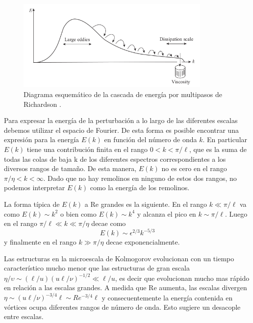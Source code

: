 \documentclass[a4paper,11pt]{report}
\begin{document}
\begin{figure}[ht]
\begin{center}
\includegraphics[width=0.85\textwidth]{figuras/kolmogorov2.png}
\end{center}
\caption{Diagrama esquemático de la cascada de energía por multipasos de Richardson \citep{davidson_2013}.}
\label{kolmogorov}
\end{figure}

Para expresar la energía de la perturbación a lo largo de las diferentes escalas debemos utilizar el espacio de Fourier. De esta forma es posible encontrar una expresión para la energía $E(k)$ en función del número de onda $k$. En particular $E(k)$ tiene una contribución finita en el rango $0 <k <\pi/\ell$, que es la suma de todas las colas de baja k de los diferentes espectros correspondientes a los diversos rangos de tamaño. De esta manera, $E(k)$ no es cero en el rango $\pi/\eta<k<\infty$. Dado que no hay remolinos en ninguno de estos dos rangos, no podemos interpretar $E(k)$ como la energía de los remolinos.

La forma típica de $E(k)$ a Re grandes es la siguiente. En el rango $k\ll \pi/\ell$ va como $E(k)\sim k^2$ o bien como $E(k)\sim k^4$ y alcanza el pico en $k\sim \pi/\ell$. Luego en el rango $\pi/\ell \ll k \ll \pi/\eta$ decae como 
\begin{equation}
E(k)\sim \epsilon^{2/3}k^{-5/3} \label{kolmo}
\end{equation}
y finalmente en el rango $k\gg \pi/\eta$ decae exponencialmente.

Las estructuras en la microescala de Kolmogorov evolucionan con un tiempo característico mucho menor que las estructuras de gran escala $\eta/\upsilon \sim (\ell/u)(u\ell/\nu)^{-1/2} \ll \ell/u$, es decir que evolucionan mucho mas rápido en relación a las escalas grandes. A medida que Re aumenta, las escalas divergen $\eta \sim (u\ell/\nu)^{-3/4}\ell \sim Re^{-3/4} \ell$ y consecuentemente la energía contenida en vórtices ocupa diferentes rangos de número de onda. Esto sugiere un desacople entre escalas.
\end{document}
